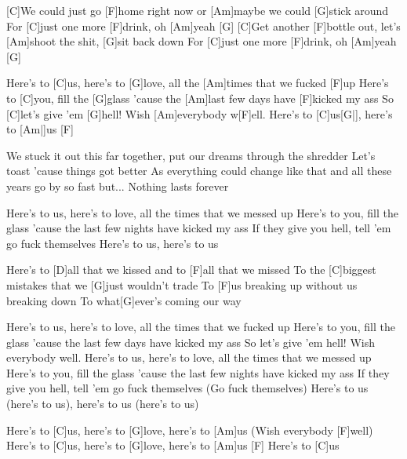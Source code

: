 


\begin{guitar}
	[C]We could just go [F]home right now or [Am]maybe we could [G]stick around
	For [C]just one more [F]drink, oh [Am]yeah [G]{}
	[C]Get another [F]bottle out, let's [Am]shoot the shit, [G]sit back down
	For [C]just one more [F]drink, oh [Am]yeah [G]{}
	
	Here's to [C]us, here's to [G]love, all the [Am]times that we fucked [F]up
	Here's to [C]you, fill the [G]glass 'cause the [Am]last few days have [F]kicked my ass
	So [C]let's give 'em [G]hell! Wish [Am]everybody w[F]ell.
	Here's to [C]us[G|], here's to [Am|]{us} [F]{}
	
	We stuck it out this far together, put our dreams through the shredder
	Let's toast 'cause things got better
	As everything could change like that and all these years go by so fast but...
	Nothing lasts forever
	
	Here's to us, here's to love, all the times that we messed up
	Here's to you, fill the glass 'cause the last few nights have kicked my ass
	If they give you hell, tell 'em go fuck themselves
	Here's to us, here's to us
	
	Here's to [D]all that we kissed and to [F]all that we missed
	To the [C]biggest mistakes that we [G]just wouldn't trade
	To [F]us breaking up without us breaking down
	To what[G]ever's coming our way
	
	Here's to us, here's to love, all the times that we fucked up
	Here's to you, fill the glass 'cause the last few days have kicked my ass
	So let's give 'em hell! Wish everybody well.
	Here's to us, here's to love, all the times that we messed up
	Here's to you, fill the glass 'cause the last few nights have kicked my ass
	If they give you hell, tell 'em go fuck themselves (Go fuck themselves)
	Here's to us (here's to us), here's to us (here's to us)
	
	Here's to [C]us, here's to [G]love, here's to [Am]us (Wish everybody [F]well)
	Here's to [C]us, here's to [G]love, here's to [Am]us [F]{}
	Here's to [C]us
\end{guitar}
